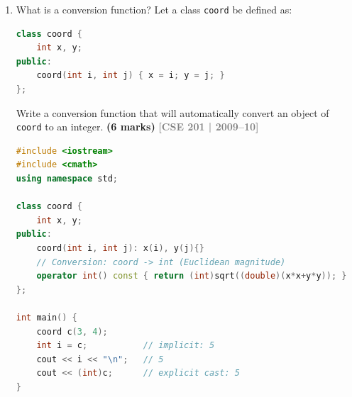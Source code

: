 \documentclass[12pt,a3paper]{article}
\newcommand{\yr}[1]{\hfill\textcolor{gray}{\small\textbf{[#1]}}}
\newcommand{\mk}[1]{\textcolor{orange!70!black}{\small\textbf{(#1 marks)}}}
\begin{document}
\begin{enumerate}
\begin{tcolorbox}[enhanced,breakable,ansbox,colback=cF!4,colframe=cF,
  boxrule=0.8pt,arc=5pt,
  title={\textbf{Answer --- Operator function, syntax, restrictions}},
  fonttitle=\bfseries\color{white},colbacktitle=cF]
\textbf{Syntax:}
\begin{lstlisting}[language=C++]
// Member function:
return_type operator@(params) { ... }
// Friend (non-member):
friend return_type operator@(param1, param2) { ... }
\end{lstlisting}

\textbf{Restrictions:}
\begin{enumerate}[label=\textbf{\arabic*.}]
  \item Cannot create new operators; only overload existing ones.
  \item Cannot change arity (number of operands).
  \item Cannot change precedence or associativity.
  \item Cannot overload: \texttt{::}, \texttt{.}, \texttt{.*},
    \texttt{?:}, \texttt{sizeof}, \texttt{typeid}.
  \item \texttt{=}, \texttt{[]}, \texttt{()}, \texttt{->} must be
    \textbf{member functions}.
  \item At least one operand must be a user-defined type.
\end{enumerate}

\end{tcolorbox}

\item What is a conversion function? Let a class \texttt{coord} be defined as:
\begin{lstlisting}[language=C++]
class coord {
    int x, y;
public:
    coord(int i, int j) { x = i; y = j; }
};
\end{lstlisting}
Write a conversion function that will automatically convert an object of \texttt{coord} to an integer. \mk{6}
\yr{CSE 201 | 2009--10}


\begin{tcolorbox}[enhanced,breakable,ansbox,colback=cF!4,colframe=cF,
  boxrule=0.8pt,arc=5pt,
  title={\textbf{Answer --- User-defined conversion function to built-in type}},
  fonttitle=\bfseries\color{white},colbacktitle=cF]

\begin{lstlisting}[language=C++]
#include <iostream>
#include <cmath>
using namespace std;

class coord {
    int x, y;
public:
    coord(int i, int j): x(i), y(j){}
    // Conversion: coord -> int (Euclidean magnitude)
    operator int() const { return (int)sqrt((double)(x*x+y*y)); }
};

int main() {
    coord c(3, 4);
    int i = c;           // implicit: 5
    cout << i << "\n";   // 5
    cout << (int)c;      // explicit cast: 5
}
\end{lstlisting}


\end{tcolorbox}
\end{enumerate}
\end{document}
